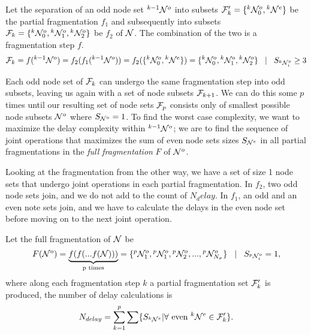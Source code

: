\begin{lemma}\label{lem:partialfrag}
  Let the separation of an odd node set ${}^{k-1}\mathcal{N}^o$ into subsets $\mathcal{F}_k'=\{{}^{k}\mathcal{N}^o_0, {}^{k}\mathcal{N}^e\}$ be the partial fragmentation $f_1$ and subsequently into subsets $\mathcal{F}_k= \{{}^{k}\mathcal{N}^o_0, {}^{k}\mathcal{N}^{o}_1, {}^{k}\mathcal{N}^{o}_2\}$ be $f_2$ of $\mathcal{N}$. The combination of the two is a fragmentation step $f$.
  \begin{equation}\label{eq:partialfrag}
    \mathcal{F}_k = f({}^{k-1}\mathcal{N}^o) = f_2(f_1({}^{k-1}\mathcal{N}^o)) = f_2(\{{}^{k}\mathcal{N}^o_0, {}^{k}\mathcal{N}^e\}) = \{{}^{k}\mathcal{N}^o_0, {}^{k}\mathcal{N}^{o}_1, {}^{k}\mathcal{N}^{o}_2\} \hspace{.3cm} | \hspace{.3cm} S_{{}^{k}\mathcal{N}^o_i} \geq 3
  \end{equation}
\end{lemma}

Each odd node set of $\mathcal{F}_k$ can undergo the same fragmentation step into odd subsets, leaving us again with a set of node subsets $\mathcal{F}_{k+1}$. We can do this some $p$ times until our resulting set of node sets $\mathcal{F}_{p}$ consists only of smallest possible node subsets $\mathcal{N}^o$ where $S_{\mathcal{N}^o}=1$. To find the worst case complexity, we want to maximize the delay complexity within ${}^{k-1}\mathcal{N}^o$; we are to find the sequence of joint operations that maximizes the sum of even node sets sizes $S_{\mathcal{N}^e}$ in all partial fragmentations in the \emph{full fragmentation} $F$ of $\mathcal{N}^o$.

Looking at the fragmentation from the other way, we have a set of size 1 node sets that undergo joint operations in each partial fragmentation. In $f_2$, two odd node sets join, and we do not add to the count of $N_delay$. In $f_1$, an odd and an even note sets join, and we have to calculate the delays in the even node set before moving on to the next joint operation.

\begin{lemma}
  Let the full fragmentation of $\mathcal{N}$ be
  \begin{equation}\label{eq:fullfrag}
    F(\mathcal{N}^o) = \underbrace{f(f(...f(\mathcal{N})))}_\text{p times} = \{{}^{p}\mathcal{N}^{o}_1, {}^{p}\mathcal{N}^{o}_1, {}^{p}\mathcal{N}^{o}_2, ... ,{}^{p}\mathcal{N}^{o}_{N_\sigma} \} \hspace{.3cm} | \hspace{.3cm} S_{{}^{p}\mathcal{N}^{o}_i} = 1,
  \end{equation}
  where along each fragmentation step $k$ a partial fragmentation set $\mathcal{F}'_k$ is produced, the number of delay calculations is
  \begin{equation}\label{eq:maxdelay}
    N_{delay} = \sum_{k=1}^{p} \sum \{ S_{{}^{k}\mathcal{N}^e} | \forall \mbox{ even } {}^{k}\mathcal{N}^e \in \mathcal{F}'_k \}.
  \end{equation}
\end{lemma}

